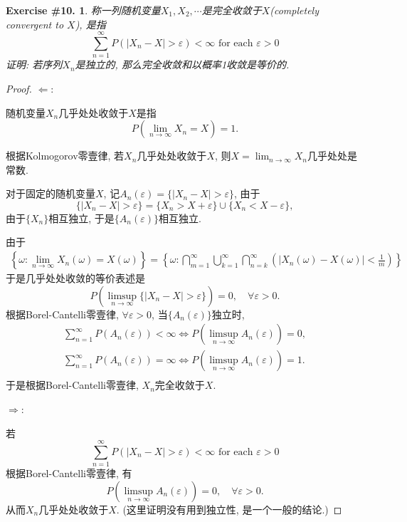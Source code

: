 \documentclass[UTF8, a4paper]{article}
\newtheorem{exercise}{Exercise \#10.}
\begin{document}
\begin{framed}
\begin{exercise}
称一列随机变量\(X_1, X_2, \cdots\)是完全收敛于\(X\)(completely convergent to \(X\)), 是指
$$
\sum_{n=1}^{\infty} P\left(\left|X_n-X\right|>\varepsilon\right)<\infty \text { for each } \varepsilon>0
$$
证明: 若序列\(X_n\)是独立的, 那么完全收敛和以概率1收敛是等价的.
\end{exercise}
\end{framed}

\begin{proof}
\(\Leftarrow\):

随机变量\(X_n\)几乎处处收敛于\(X\)是指
$$
P(\lim_{n\to\infty}X_n = X) = 1.
$$

根据Kolmogorov零壹律, 若\(X_n\)几乎处处收敛于\(X\), 则\(X = \lim_{n\to\infty}X_n\)几乎处处是常数.

对于固定的随机变量\(X\), 记\(A_n(\varepsilon) = \{|X_n - X| > \varepsilon\}\), 
由于
$$
\{|X_n - X| > \varepsilon\} = \{X_n > X + \varepsilon\} \cup \{X_n < X - \varepsilon\}, 
$$
由于\(\{X_n\}\)相互独立, 于是\(\{A_n(\varepsilon)\}\)相互独立.



由于
$$
\begin{gathered}
\left\{\omega: \lim _{n \rightarrow \infty} X_n(\omega)=X(\omega)\right\} 
=\left\{\omega: \bigcap_{m=1}^{\infty} \bigcup_{k=1}^{\infty} \bigcap_{n=k}^{\infty}\left(\left|X_n(\omega)-X(\omega)\right|<\frac{1}{m}\right)\right\}
\end{gathered}
$$
于是几乎处处收敛的等价表述是
$$
P(\limsup_{n\to\infty} \{|X_n - X| > \varepsilon\}) = 0, \quad \forall \varepsilon > 0.
$$
根据Borel-Cantelli零壹律, \(\forall \varepsilon > 0\), 当\(\{A_n(\varepsilon)\}\)独立时, 
$$
\begin{gathered}
    \sum_{n=1}^{\infty}P(A_n(\varepsilon)) < \infty \iff P(\limsup_{n \to \infty} A_n(\varepsilon)) = 0, \\
    \sum_{n=1}^{\infty}P(A_n(\varepsilon)) = \infty \iff P(\limsup_{n \to \infty} A_n(\varepsilon)) = 1. \\
\end{gathered}
$$
于是根据Borel-Cantelli零壹律, \(X_n\)完全收敛于\(X\).

\(\Rightarrow\):

若
$$
\sum_{n=1}^{\infty} P\left(\left|X_n-X\right|>\varepsilon\right)<\infty \text { for each } \varepsilon>0
$$
根据Borel-Cantelli零壹律, 有
$$
P(\limsup_{n\to\infty} A_n(\varepsilon)) = 0, \quad \forall \varepsilon >0.
$$
从而\(X_n\)几乎处处收敛于\(X\). (这里证明没有用到独立性, 是一个一般的结论.)
\end{proof}
\end{document}
